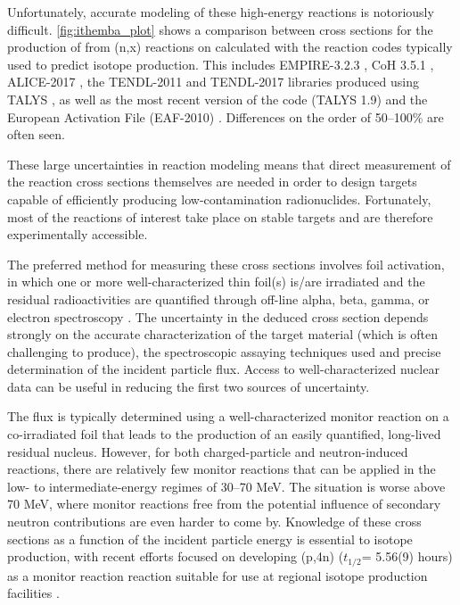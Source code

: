 \documentclass[letterpaper]{ar-1col}
\begin{document}
Unfortunately, accurate modeling of these high-energy reactions is notoriously difficult.
 \autoref{fig:ithemba_plot} shows a comparison between cross sections for the production of  from (n,x) reactions on  calculated with the reaction codes typically used to predict isotope production.
 This includes EMPIRE-3.2.3 \cite{Herman2013}, CoH 3.5.1 \cite{KAWANO2010}, ALICE-2017 \cite{Blann1996}, the TENDL-2011 and TENDL-2017 libraries produced using TALYS \cite{Rochman2017}, as well as the most recent version of the code (TALYS 1.9) \cite{Koning2012} and the European Activation File (EAF-2010) \cite{Forrest2005}.
 Differences on the order of 50--100\% are often seen.
 

These large uncertainties in reaction modeling means that direct measurement of the reaction cross sections themselves are needed in order to design targets capable of efficiently producing low-contamination radionuclides.
 Fortunately, most of the reactions of interest take place on stable targets and are therefore experimentally accessible.


The preferred method for measuring these cross sections involves foil activation, in which one or more well-characterized thin foil(s) is/are irradiated and the residual radioactivities are quantified through off-line alpha, beta, gamma, or electron spectroscopy \cite{Voyles2018a,Graves2016}.
 The uncertainty in the deduced cross section depends strongly on the accurate characterization of the target material (which is often challenging to produce), the spectroscopic assaying techniques used and precise determination of the incident particle flux.
Access to well-characterized nuclear data can be useful in reducing the first two sources of uncertainty.



The flux is typically determined using a well-characterized monitor reaction on a co-irradiated foil that leads to the production of an easily quantified, long-lived residual nucleus.
However, for both charged-particle and neutron-induced reactions, there are relatively few monitor reactions that can be applied in the low- to intermediate-energy regimes of 30--70 MeV.
 The situation is worse above 70 MeV, where monitor reactions  free from the potential influence of secondary neutron contributions are even harder to come by.
 Knowledge of these cross sections as a function of the incident particle energy is essential to  isotope production, with recent efforts focused on developing  (p,4n) ($t_{1/2}$= 5.56(9) hours) as a monitor reaction reaction suitable for use at regional isotope production facilities \cite{Voyles2018a, Kim2018}.
 
\end{document}
